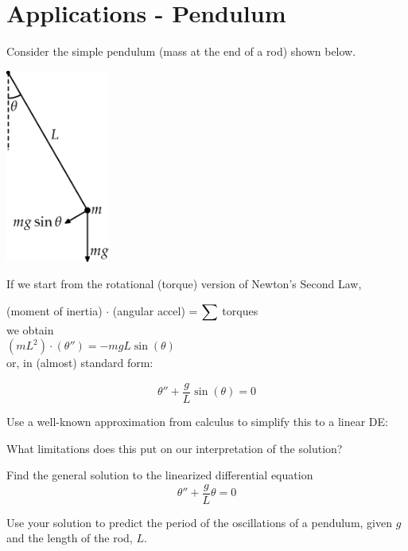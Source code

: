\newpage
{}
\section*{Applications - Pendulum }
\problem
Consider the simple pendulum (mass at the end of a rod) shown below.
\begin{center}
\includegraphics[height=2.5in]{graphics/notes_08_Simple-Pendulum-Labeled-Diagram}
\end{center}

If we start from the rotational (torque) version of Newton's Second Law,
 
\begin{center}
  (moment of inertia) $\cdot$ (angular accel) = $\displaystyle \sum $ torques \\ 
we obtain \\
$(m L^2) \cdot ( \theta '') = -mg L \sin(\theta)$ \\
or, in (almost) standard form: 
\end{center}

\newpage
$$ \theta'' + \frac{g}{L} \sin(\theta) = 0$$

Use a well-known approximation from calculus to simplify this to a
linear DE:

\vfill

What limitations does this put on our interpretation of the solution?

\vfill

\newpage

Find the general solution to the linearized differential equation
$$ \theta'' + \frac{g}{L} \theta = 0$$

\vfill

Use your solution to predict the period of the oscillations of a
pendulum, given $g$ and the length of the rod, $L$.

\vfill

\newpage

